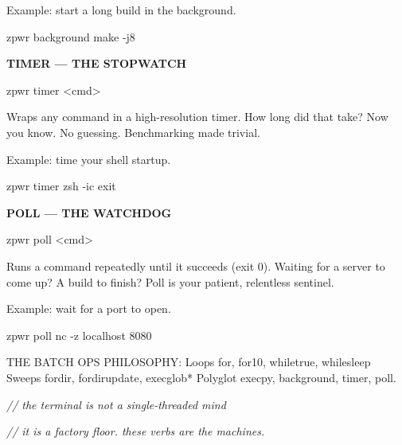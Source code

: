 \documentclass[11pt,a4paper,twoside]{book}
\begin{document}
Example: start a long build in the background.

\begin{codebox}
\color{neongreen}zpwr background make -j8\\
\end{codebox}


\vspace{12pt}
{\bfseries\color{neonyellow} TIMER — THE STOPWATCH}\vspace{4pt}

\begin{codebox}
\color{neongreen}zpwr timer <cmd>\\
\end{codebox}

Wraps any command in a high-resolution timer. How long did that take? Now you know. No guessing. Benchmarking made trivial.

Example: time your shell startup.

\begin{codebox}
\color{neongreen}zpwr timer zsh -ic exit\\
\end{codebox}


\vspace{12pt}
{\bfseries\color{neonyellow} POLL — THE WATCHDOG}\vspace{4pt}

\begin{codebox}
\color{neongreen}zpwr poll <cmd>\\
\end{codebox}

Runs a command repeatedly until it succeeds (exit 0). Waiting for a server to come up? A build to finish? Poll is your patient, relentless sentinel.

Example: wait for a port to open.

\begin{codebox}
\color{neongreen}zpwr poll nc -z localhost 8080\\
\end{codebox}

THE BATCH OPS PHILOSOPHY: Loops        for, for10, whiletrue, whilesleep Sweeps       fordir, fordirupdate, execglob* Polyglot     execpy, background, timer, poll.

{\small\itshape\color{dimtext} // the terminal is not a single-threaded mind}

{\small\itshape\color{dimtext} // it is a factory floor. these verbs are the machines.}
\end{document}
